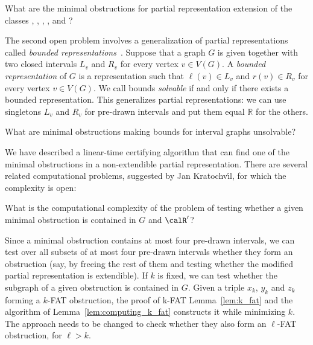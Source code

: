 \begin{problem} \label{prob:other_minimal_obstructions}
What are the minimal obstructions for partial representation extension of the classes \circle, \fun,
\perm, \pint, and \uint?
\end{problem}

The second open problem involves a generalization of partial representations called \emph{bounded
representations}~\cite{bko,kkorssv,soulignac}. Suppose that a graph $G$ is given together with two closed
intervals $L_v$ and $R_v$ for every vertex $v \in V(G)$. A \emph{bounded representation} of $G$ is a
representation such that $\ell(v) \in L_v$ and $r(v) \in R_v$ for every vertex $v \in V(G)$. We call
bounds \emph{solvable} if and only if there exists a bounded representation.
This generalizes partial representations: we can use singletons $L_v$ and $R_v$ for pre-drawn 
intervals and put them equal $\mathbb R$ for the others.

\begin{problem} \label{prob:bounded_representations}
What are minimal obstructions making bounds for interval graphs unsolvable?
\end{problem}

We have described a linear-time certifying algorithm that can find one of the minimal obstructions
in a non-extendible partial representation. There are several related computational problems,
suggested by Jan Kratochv\'{\i}l, for which the complexity is open:

\begin{problem} \label{prob:obstruction_testing}
What is the computational complexity of the problem of testing whether a given minimal obstruction
is contained in $G$ and $\calR'$?
\end{problem}

Since a minimal obstruction contains at most four pre-drawn intervals, we can test over all subsets
of at most four pre-drawn intervals whether they form an obstruction (say, by freeing the rest of
them and testing whether the modified partial representation is extendible). If $k$ is fixed, we can
test whether the subgraph of a given obstruction is contained in $G$. Given a triple $x_k$, $y_k$
and $z_k$ forming a $k$-FAT obstruction, the proof of k-FAT Lemma~\ref{lem:k_fat} and the algorithm
of Lemma~\ref{lem:computing_k_fat} constructs it while minimizing $k$. The approach needs to be
changed to check whether they also form an $\ell$-FAT obstruction, for $\ell > k$.

